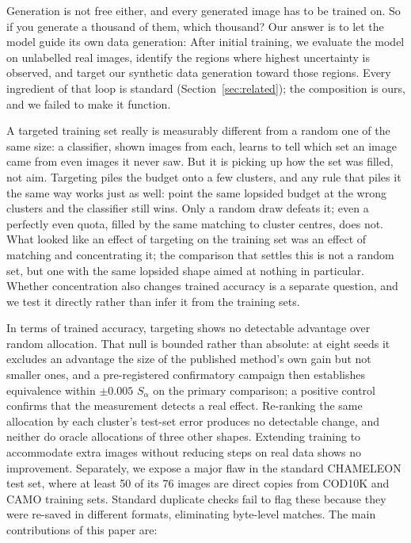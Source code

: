 \documentclass{article}
\newif\ifrevmarked \revmarkedtrue
\DeclareRobustCommand{\revB}[1]{\ifrevmarked{\color{RevB}#1}\else{#1}\fi}
\DeclareRobustCommand{\revC}[1]{\ifrevmarked{\color{RevC}#1}\else{#1}\fi}
\DeclareRobustCommand{\revShared}[1]{\ifrevmarked{\color{RevShared}#1}\else{#1}\fi}
\begin{document}
Generation is not free either, and every generated image has to be trained on. So if you generate
a thousand of them, which thousand? Our answer is to let the model guide its own data generation: After initial training, we evaluate the model on unlabelled real images, identify the regions where highest uncertainty is observed, and target our synthetic data generation toward those regions. Every ingredient of that loop is standard
(Section~\ref{sec:related}); the composition is ours, and we failed to make it function.


A targeted training set really is measurably different from a random one of the same size: a classifier, shown images from each, learns to tell which set an image came from even images it never saw. But it is picking up \revB{how the set was filled}, not aim. Targeting piles the budget onto a few clusters, and any rule that piles it the same way works just as well: point the same lopsided budget at the wrong clusters and the classifier still wins. \revB{Only a random draw defeats it; even a perfectly even quota, filled by the same matching to cluster centres, does not.} What looked like an effect of targeting on the training set was an effect of \revB{matching and} concentrating it; the
comparison that settles this is not a random set, but one with the same lopsided shape
aimed at nothing in particular. \revShared{Whether concentration also changes trained accuracy is a separate question, and we
test it directly rather than infer it from the training sets.}


In terms of trained accuracy, targeting shows \revShared{no detectable advantage} over random allocation. That null is
bounded rather than absolute: \revShared{at eight seeds it excludes an advantage the size of the published method's own gain
but not smaller ones, and a pre-registered confirmatory campaign then establishes equivalence within $\pm0.005$
$S_\alpha$ on the primary comparison;} a positive control confirms that the measurement
detects a real effect.
\revB{Re-ranking the same allocation by each cluster's test-set error produces no detectable change, and neither do
oracle allocations of three other shapes.} Extending training to accommodate extra images without reducing steps on real data shows no improvement. Separately, we expose a major flaw in the standard CHAMELEON test set, where \revC{at least} 50 of its 76 images are direct copies from COD10K and CAMO training sets. Standard duplicate checks fail to flag these because they were re-saved in different formats, eliminating byte-level matches. The main contributions of this paper are:
\end{document}
